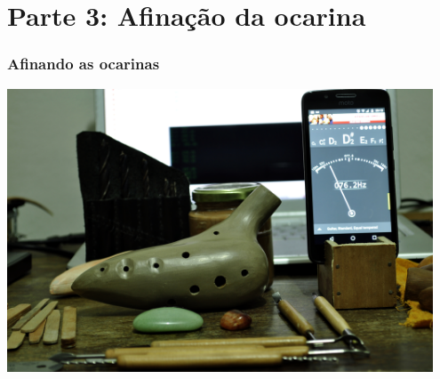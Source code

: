 \section{Parte 3: Afinação da ocarina}

\begin{frame}
\frametitle{Afinando as ocarinas}
\includegraphics[width=0.950\textwidth]{sections/parte3/afinando1.JPG}
\end{frame}
